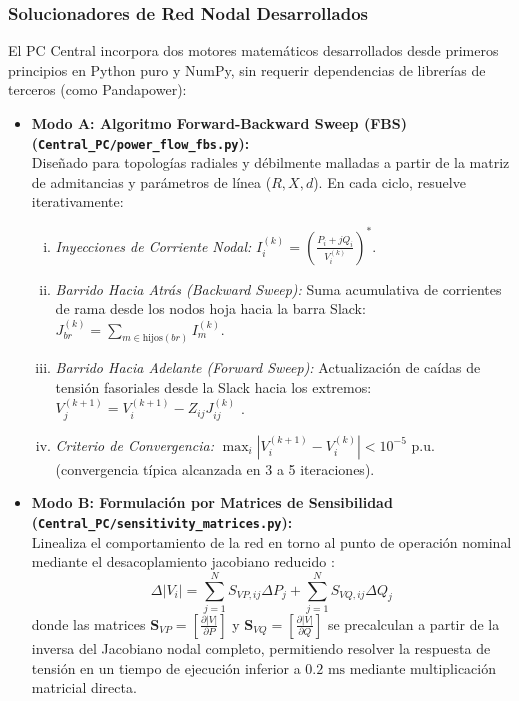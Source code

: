 \subsubsection{Solucionadores de Red Nodal Desarrollados}
El PC Central incorpora dos motores matemáticos desarrollados desde primeros principios en Python puro y NumPy, sin requerir dependencias de librerías de terceros (como Pandapower):
\begin{itemize}
    \item \textbf{Modo A: Algoritmo Forward-Backward Sweep (FBS) (\texttt{Central\_PC/power\_flow\_fbs.py}):}\\
    Diseñado para topologías radiales y débilmente malladas a partir de la matriz de admitancias y parámetros de línea ($R, X, d$). En cada ciclo, resuelve iterativamente:
    \begin{enumerate}[i.]
        \item \textit{Inyecciones de Corriente Nodal:} $I_i^{(k)} = \left(\frac{P_i + j Q_i}{V_i^{(k)}} \right)^*$.
        \item \textit{Barrido Hacia Atrás (Backward Sweep):} Suma acumulativa de corrientes de rama desde los nodos hoja hacia la barra Slack: $J_{br}^{(k)} = \sum_{m \in \text{hijos}(br)} I_m^{(k)}$.
        \item \textit{Barrido Hacia Adelante (Forward Sweep):} Actualización de caídas de tensión fasoriales desde la Slack hacia los extremos: $V_j^{(k+1)} = V_i^{(k+1)} - Z_{ij} J_{ij}^{(k)}$ \citep{DiFazio2024Linear}.
        \item \textit{Criterio de Convergencia:} $\max_i |V_i^{(k+1)} - V_i^{(k)}| < 10^{-5}\text{ p.u.}$ (convergencia típica alcanzada en 3 a 5 iteraciones).
    \end{enumerate}

    \item \textbf{Modo B: Formulación por Matrices de Sensibilidad (\texttt{Central\_PC/sensitivity\_matrices.py}):}\\
    Linealiza el comportamiento de la red en torno al punto de operación nominal mediante el desacoplamiento jacobiano reducido \citep{Pompodakis2022Sensitivity}:
    \begin{equation}
    \Delta |V_i| = \sum_{j=1}^N S_{VP, ij} \Delta P_j + \sum_{j=1}^N S_{VQ, ij} \Delta Q_j
    \end{equation}
    donde las matrices $\mathbf{S}_{VP} = \left[\frac{\partial |V|}{\partial P}\right]$ y $\mathbf{S}_{VQ} = \left[\frac{\partial |V|}{\partial Q}\right]$ se precalculan a partir de la inversa del Jacobiano nodal completo, permitiendo resolver la respuesta de tensión en un tiempo de ejecución inferior a $0.2\text{ ms}$ mediante multiplicación matricial directa.
\end{itemize}

